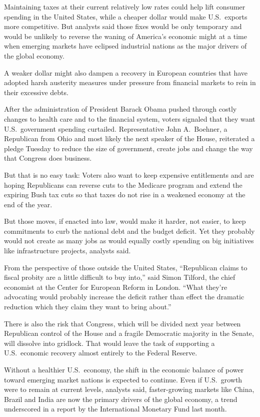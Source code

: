 ﻿\documentclass[12pt]{article}
\begin{document}
Maintaining taxes at their current relatively low rates could help lift consumer spending in the
United States, while a cheaper dollar would make U.S.~exports more competitive. But analysts said
those fixes would be only temporary and would be unlikely to reverse the waning of America's
economic might at a time when emerging markets have eclipsed industrial nations as the major drivers
of the global economy.

A weaker dollar might also dampen a recovery in European countries that have adopted harsh austerity
measures under pressure from financial markets to rein in their excessive debts.

After the administration of President Barack Obama pushed through costly changes to health care and
to the financial system, voters signaled that they want U.S.~government spending curtailed.
Representative John A.~Boehner, a Republican from Ohio and most likely the next speaker of the
House, reiterated a pledge Tuesday to reduce the size of government, create jobs and change the way
that Congress does business.

But that is no easy task: Voters also want to keep expensive entitlements and are hoping Republicans
can reverse cuts to the Medicare program and extend the expiring Bush tax cuts so that taxes do not
rise in a weakened economy at the end of the year.

But those moves, if enacted into law, would make it harder, not easier, to keep commitments to curb
the national debt and the budget deficit. Yet they probably would not create as many jobs as would
equally costly spending on big initiatives like infrastructure projects, analysts said.

From the perspective of those outside the United States, ``Republican claims to fiscal probity are a
little difficult to buy into,'' said Simon Tilford, the chief economist at the Center for European
Reform in London. ``What they're advocating would probably increase the deficit rather than effect
the dramatic reduction which they claim they want to bring about.''

There is also the risk that Congress, which will be divided next year between Republican control of
the House and a fragile Democratic majority in the Senate, will dissolve into gridlock. That would
leave the task of supporting a U.S.~economic recovery almost entirely to the Federal Reserve.

Without a healthier U.S.~economy, the shift in the economic balance of power toward emerging market
nations is expected to continue. Even if U.S.~growth were to remain at current levels, analysts
said, faster-growing markets like China, Brazil and India are now the primary drivers of the global
economy, a trend underscored in a report by the International Monetary Fund last month.
\end{document}
